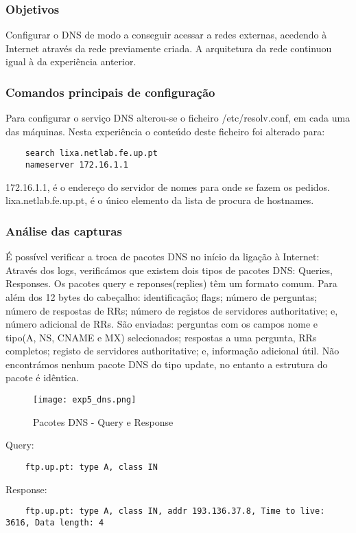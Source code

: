 \documentclass[a4paper]{article}
\begin{document}
\subsubsection{Objetivos}
Configurar o DNS de modo a conseguir acessar a redes externas, acedendo à Internet através da rede previamente criada. A arquitetura da rede continuou igual à da experiência anterior.

\subsubsection{Comandos principais de configuração}
Para configurar o serviço DNS alterou-se o ficheiro /etc/resolv.conf, em cada uma das máquinas. Nesta experiência o conteúdo deste ficheiro foi alterado para:

\begin{verbatim}
	search lixa.netlab.fe.up.pt
	nameserver 172.16.1.1
\end{verbatim}

172.16.1.1, é o endereço do servidor de nomes para onde se fazem os pedidos. lixa.netlab.fe.up.pt, é o único elemento da lista de procura de hostnames.


\subsubsection{Análise das capturas}

É possível verificar a troca de pacotes DNS no início da ligação à Internet:
Através dos logs, verificámos que existem dois tipos de pacotes DNS: Queries, Responses. Os pacotes query e reponses(replies) têm um formato comum. Para além dos 12 bytes do cabeçalho: identificação; flags; número de perguntas; número de respostas de RRs; número de registos de servidores authoritative; e, número adicional de RRs. São enviadas: perguntas com os campos nome e tipo(A, NS, CNAME e MX) selecionados; respostas a uma pergunta, RRs completos; registo de servidores authoritative; e, informação adicional útil. Não encontrámos nenhum pacote DNS do tipo update, no entanto a estrutura do pacote é idêntica.

\begin{figure}[h]
    \centering
    \texttt{[image: exp5\_dns.png]}
    \caption{Pacotes DNS - Query e Response}
\end{figure}

Query:
\begin{verbatim}
	ftp.up.pt: type A, class IN
\end{verbatim}
Response:
\begin{verbatim}
	ftp.up.pt: type A, class IN, addr 193.136.37.8, Time to live: 3616, Data length: 4
\end{verbatim}
\end{document}
